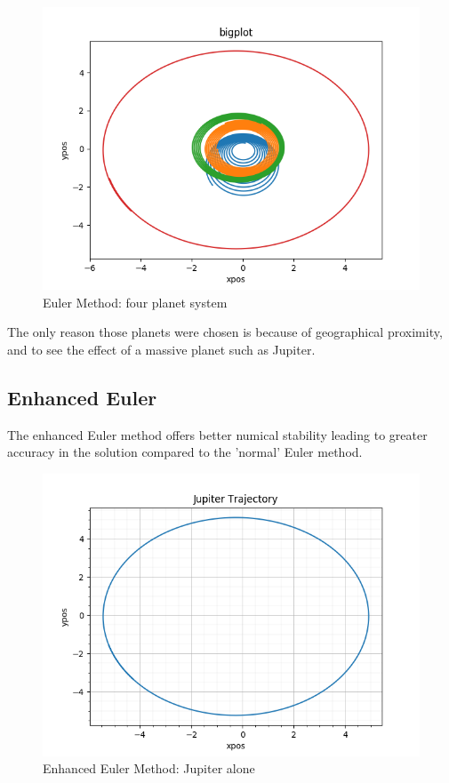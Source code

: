\documentclass[12pt]{article} %
\begin{document}
\begin{figure}
	\includegraphics[scale=\scaleA]{euler_multiplanet.png}
	\centering
	\caption{Euler Method: four planet system}
	\label{fig:eulermultiplanet}
\end{figure}

The only reason those planets were chosen is because of geographical proximity, and to see the effect of a massive planet such as Jupiter. 

\subsection{Enhanced Euler}
The enhanced Euler method offers better numical stability leading to greater accuracy in the solution compared to the 'normal' Euler method.

\begin{figure}
	\includegraphics[scale=\scaleA]{euler_enhanced_jupiter.png}
	\centering
	\caption{Enhanced Euler Method: Jupiter alone}
	\label{fig:enhancedeulerbinary}
\end{figure}
\end{document}

